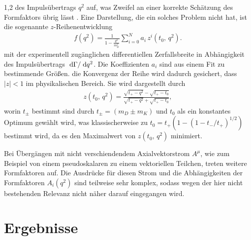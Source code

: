 \documentclass[11pt,a4paper,twoside]{report}
\begin{document}
\begin{spacing}{1,2}
des Impulsübertrags $q^2$ auf, was Zweifel an einer korrekte Schätzung des Formfaktors übrig lässt \cite{PhysRev_Data}. Eine Darstellung, die ein solches Problem nicht hat,
ist die sogenannte $z$-Reihenentwicklung
\begin{align}
 f(q^2) = \frac{1}{1-\frac{q^2}{m_D^2}} \sum\limits_{i=0}^N a_i\,z^i(t_0,\, q^2).
\end{align}
mit der experimentell zugänglichen differentiellen Zerfallsbreite in Abhängigkeit des Impulsübertrags $\; \mathrm{d} \Gamma/\; \mathrm{d} q^2$. Die Koeffizienten $a_i$ sind
aus einem Fit zu bestimmende Größen. die Konvergenz der Reihe wird dadurch gesichert, dass $|z|<1$ im physikalischen Bereich. Sie wird dargestellt durch
\begin{align}
 z(t_0,\, q^2)= \frac{\sqrt{t_+-q^2}-\sqrt{t_+-t_0}}{\sqrt{t_+-q^2}+\sqrt{t_+-t_0}},
\end{align}
worin $t_\pm$ bestimmt sind durch $t_\pm = (m_D \pm m_K)$ und $t_0$ als ein konstantes Optimum gewählt wird, was klassischerweise zu 
$t_0 = t_+(1-(1-t_-/t_+)^{1/2})$ bestimmt wird, da es den Maximalwert von $z(t_0,\, q^2)$ minimiert.

Bei Übergängen mit nicht verschiendendem Axialvektorstrom $A^\mu$, wie zum Beispiel von einem pseudoskalaren zu einem vektoriellen Teilchen, treten 
weitere Formfaktoren auf. Die Ausdrücke für diesen Strom und die Abhängigkeiten der Formfaktoren $A_i(q^2)$ sind teilweise sehr komplex, sodass wegen
der hier nicht bestehenden Relevanz nicht näher darauf eingegangen wird.

\chapter{Ergebnisse}

\end{spacing}
\end{document}
